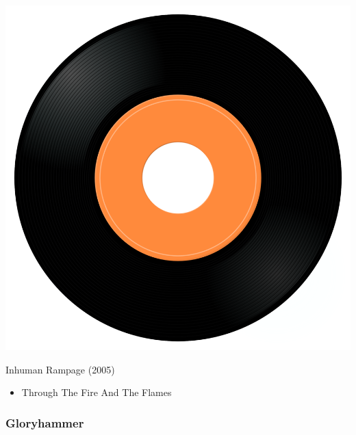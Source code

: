 \begin{minipage}[t]{0.25\textwidth}
\captionsetup{type=figure}
\includegraphics[width=\textwidth]{Images/cover.png}
\caption*{Inhuman Rampage (2005)}
\end{minipage}
\begin{minipage}[t]{0.25\textwidth}\vspace{0pt}
\begin{itemize}[nosep,leftmargin=1em,labelwidth=*,align=left]
	\setlength{\itemsep}{0pt}
	\item Through The Fire And The Flames
\end{itemize}
\end{minipage}

\subsubsection{Gloryhammer}

